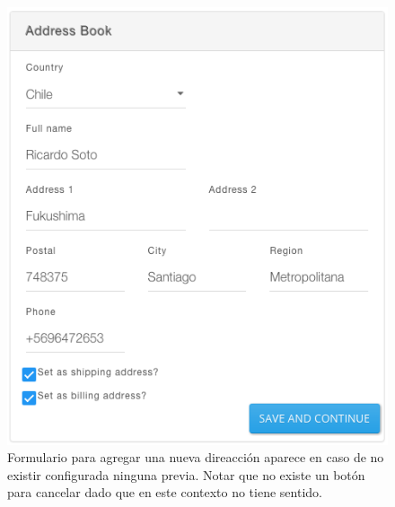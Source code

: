 		\begin{figure}[h!]
			\centering
			\includegraphics[width=1\textwidth]{figuras/address/form/add_first_address.png}
			\caption{Formulario para agregar una nueva direacción aparece en caso de no existir configurada ninguna previa. Notar que no existe un botón para cancelar dado que en este contexto no tiene sentido.}
			\label{figure:address:form:add_first_address}
		\end{figure}




